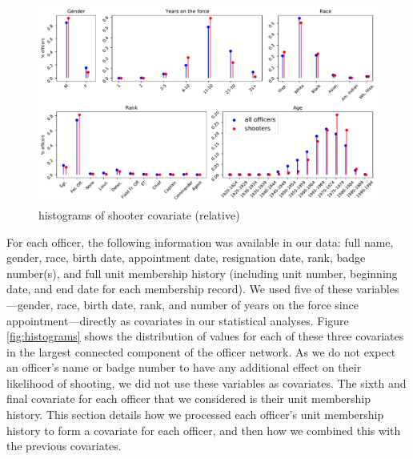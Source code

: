\begin{figure}
\centering
\includegraphics[width=\textwidth]{figs/shooters_relative.pdf}
\caption{histograms of shooter covariate (relative)}\label{fig:shooterhist}
\end{figure}

For each officer, the following information was available in our data: full
name, gender, race, birth date, appointment date, resignation date, rank, badge
number(s), and full unit membership history (including unit number, beginning date, and end date for each membership record).  
We used five of these variables---gender, race, birth date, rank, and number of years on the force since appointment---directly
as covariates in our statistical analyses. 
Figure \ref{fig:histograms} shows the distribution of values for each of these three covariates in the largest
connected component of the officer network. 
As we do not expect an officer's name or badge number to have any additional effect on their likelihood of shooting,
we did not use these variables as covariates. 
The sixth and final covariate for each officer that we considered is their unit membership history.
This section details how we processed each officer's unit membership
history to form a covariate for each officer, and then how we combined this with the previous covariates.


